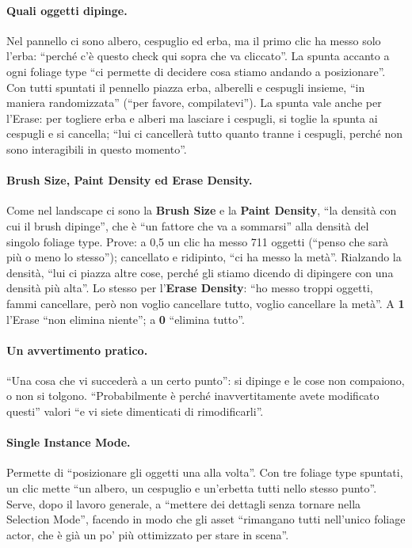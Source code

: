 \paragraph{Quali oggetti dipinge.} Nel pannello ci sono albero, cespuglio ed erba, ma il
primo clic ha messo solo l'erba: ``perché c'è questo check qui sopra che va cliccato''. La
spunta accanto a ogni foliage type ``ci permette di decidere cosa stiamo andando a
posizionare''. Con tutti spuntati il pennello piazza erba, alberelli e cespugli insieme, ``in
maniera randomizzata'' (``per favore, compilatevi''). La spunta vale anche per l'Erase: per
togliere erba e alberi ma lasciare i cespugli, si toglie la spunta ai cespugli e si cancella;
``lui ci cancellerà tutto quanto tranne i cespugli, perché non sono interagibili in questo
momento''.

\paragraph{Brush Size, Paint Density ed Erase Density.} Come nel landscape ci sono la
\textbf{Brush Size} e la \textbf{Paint Density}, ``la densità con cui il brush dipinge'', che è
``un fattore che va a sommarsi'' alla densità del singolo foliage type. Prove: a 0,5 un clic
ha messo 711 oggetti (``penso che sarà più o meno lo stesso''); cancellato e ridipinto, ``ci ha
messo la metà''. Rialzando la densità, ``lui ci piazza altre cose, perché gli stiamo dicendo di
dipingere con una densità più alta''. Lo stesso per l'\textbf{Erase Density}: ``ho messo troppi
oggetti, fammi cancellare, però non voglio cancellare tutto, voglio cancellare la metà''. A
\textbf{1} l'Erase ``non elimina niente''; a \textbf{0} ``elimina tutto''.

\paragraph{Un avvertimento pratico.} ``Una cosa che vi succederà a un certo punto'': si dipinge
e le cose non compaiono, o non si tolgono. ``Probabilmente è perché inavvertitamente avete
modificato questi'' valori ``e vi siete dimenticati di rimodificarli''.

\paragraph{Single Instance Mode.} Permette di ``posizionare gli oggetti una alla volta''. Con
tre foliage type spuntati, un clic mette ``un albero, un cespuglio e un'erbetta tutti nello
stesso punto''. Serve, dopo il lavoro generale, a ``mettere dei dettagli senza tornare nella
Selection Mode'', facendo in modo che gli asset ``rimangano tutti nell'unico foliage actor,
che è già un po' più ottimizzato per stare in scena''.

